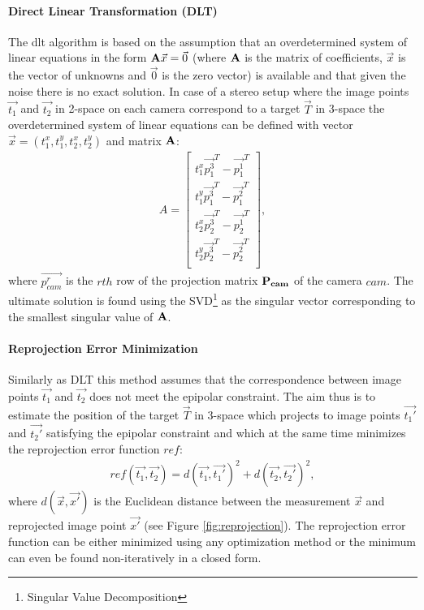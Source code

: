 \paragraph{Direct Linear Transformation (DLT)} The \gls{dlt} algorithm is based on the assumption that an overdetermined system of linear equations in the form $\mathbf{A}\vec{x} = \vec{0}$ (where $\mathbf{A}$ is the matrix of coefficients, $\vec{x}$ is the vector of unknowns and $\vec{0}$ is the zero vector) is available and that given the noise there is no exact solution. In case of a stereo setup where the image points $\vec{t_{1}}$ and $\vec{t_{2}}$ in 2-space on each camera correspond to a target $\vec{T}$ in 3-space the overdetermined system of linear equations can be defined with vector $\vec{x} = (t_{1}^{x}, t_{1}^{y}, t_{2}^{x}, t_{2}^{y})$ and matrix $\mathbf{A}$:
\begin{align}
	A = \begin{bmatrix}
		t_{1}^{x}\vec{p_{1}^{3}}^{T} - \vec{p_{1}^{1}}^{T} \\
		t_{1}^{y}\vec{p_{1}^{3}}^{T} - \vec{p_{1}^{2}}^{T} \\
		t_{2}^{x}\vec{p_{2}^{3}}^{T} - \vec{p_{2}^{1}}^{T} \\
		t_{2}^{y}\vec{p_{2}^{3}}^{T} - \vec{p_{2}^{2}}^{T} \\
	\end{bmatrix},
\end{align}
where $\vec{p_{cam}^{r}}$ is the $rth$ row of the projection matrix $\mathbf{P_{cam}}$ of the camera $cam$. The ultimate solution is found using the SVD\footnote{Singular Value Decomposition} as the singular vector corresponding to the smallest singular value of $\mathbf{A}$.

\paragraph{Reprojection Error Minimization} Similarly as DLT this method assumes that the correspondence between image points $\vec{t_{1}}$ and $\vec{t_{2}}$ does not meet the epipolar constraint. The aim thus is to estimate the position of the target $\vec{T}$ in 3-space which projects to image points $\vec{t_{1}'}$ and $\vec{t_{2}'}$ satisfying the epipolar constraint and which at the same time minimizes the reprojection error function $ref$:
\begin{align}
	ref(\vec{t_{1}}, \vec{t_{2}}) = d(\vec{t_{1}}, \vec{t_{1}'})^{2} + d(\vec{t_{2}}, \vec{t_{2}'})^{2},
\end{align}
where $d(\vec{x}, \vec{x'})$ is the Euclidean distance between the measurement $\vec{x}$ and reprojected image point $\vec{x'}$ (see Figure \ref{fig:reprojection}). The reprojection error function can be either minimized using any optimization method or the minimum can even be found non-iteratively in a closed form.

